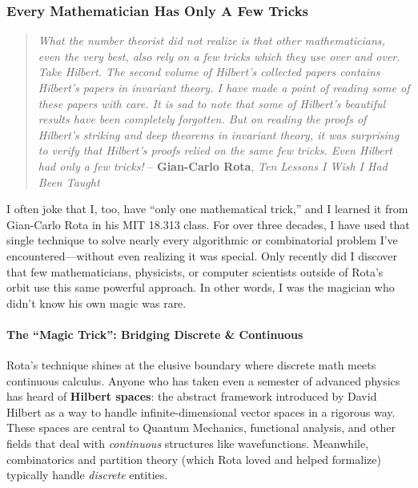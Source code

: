 \documentclass{report}
\begin{document}
\subsubsection*{Every Mathematician Has Only A Few Tricks}

\begin{quotation}
\emph{What the number theorist did not realize is that other mathematicians, even the very best, also rely on a few tricks which they use over and over. Take Hilbert. The second volume of Hilbert's collected papers contains Hilbert's papers in invariant theory. I have made a point of reading some of these papers with care. It is sad to note that some of Hilbert's beautiful results have been completely forgotten. But on reading the proofs of Hilbert's striking and deep theorems in invariant theory, it was surprising to verify that Hilbert's proofs relied on the same few tricks. Even Hilbert had only a few tricks!} 
\newline
-- \textbf{Gian-Carlo Rota}, \emph{Ten Lessons I Wish I Had Been Taught}\cite{Rota1997}
\end{quotation}

I often joke that I, too, have ``only one mathematical trick,'' and I learned it from Gian-Carlo Rota
in his MIT 18.313 class. For over three decades, I have used that single technique to solve nearly
every algorithmic or combinatorial problem I've encountered—without even realizing it was special.
Only recently did I discover that few mathematicians, physicists, or computer scientists outside of
Rota's orbit use this same powerful approach. In other words, I was the magician who didn't know
his own magic was rare.

\paragraph*{The ``Magic Trick'': Bridging Discrete \& Continuous}
Rota's technique shines at the elusive boundary where discrete math meets continuous calculus. 
Anyone who has taken even a semester of advanced physics has heard of \textbf{Hilbert spaces}: the
abstract framework introduced by David Hilbert as a way to handle infinite-dimensional vector spaces
in a rigorous way. These spaces are central to Quantum Mechanics, functional analysis, and other
fields that deal with \emph{continuous} structures like wavefunctions. Meanwhile, combinatorics and
partition theory (which Rota loved and helped formalize) typically handle \emph{discrete} entities.
\end{document}

